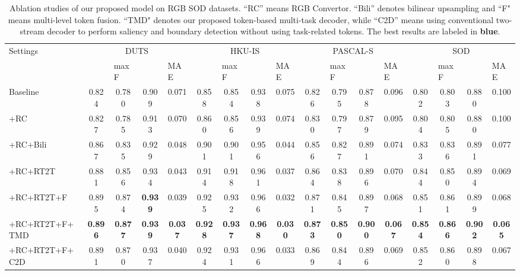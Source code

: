 \documentclass[10pt,twocolumn,letterpaper]{article}
\def\blu#1{\textbf{\color{blue} #1}} \def\red#1{\textbf{\color{red}\underline{#1}}}
\begin{document}
\begin{table*}[!ht]
\centering
\footnotesize
\renewcommand{\arraystretch}{1.1}
\renewcommand{\tabcolsep}{1.3mm}
\caption{Ablation studies of our proposed model on RGB SOD datasets. ``RC'' means RGB Convertor.  ``Bili'' denotes bilinear upsampling and ``F" means multi-level token fusion. ``TMD" denotes our proposed token-based multi-task decoder, while ``C2D'' means using conventional two-stream decoder to perform saliency and boundary detection without using task-related tokens. The best results are labeled in \blu{blue}.
}
\begin{tabular}{l|l|cccc|cccc|cccc|cccc}
\hline
\multicolumn{2}{l|}{\multirow{2}{*}{Settings}} & \multicolumn{4}{c|}{DUTS \cite{wang2017duts}} & \multicolumn{4}{c|}{HKU-IS \cite{li2015HKUIS}} & \multicolumn{4}{c|}{PASCAL-S \cite{li2014PASCALS}} & \multicolumn{4}{c}{SOD \cite{movahedi2010SOD}}\\
\multicolumn{2}{l|}{} & \multicolumn{1}{l}{} & \multicolumn{1}{l}{maxF} & \multicolumn{1}{l}{} & \multicolumn{1}{l|}{MAE}
                      & \multicolumn{1}{l}{} & \multicolumn{1}{l}{maxF} & \multicolumn{1}{l}{} & \multicolumn{1}{l|}{MAE}
                      & \multicolumn{1}{l}{} & \multicolumn{1}{l}{maxF} & \multicolumn{1}{l}{} & \multicolumn{1}{l|}{MAE}
                      & \multicolumn{1}{l}{} & \multicolumn{1}{l}{maxF} & \multicolumn{1}{l}{} & \multicolumn{1}{l}{MAE}




  \\ \hline

\multicolumn{2}{l|}{Baseline}  &0.824  &0.780  &0.909  &0.071 &0.858  &0.854  &0.938  &0.075 &0.826 &0.795 &0.878  &0.096 &0.802 &0.803  &0.880 &0.100 \\ \hline
\multicolumn{2}{l|}{+RC}      &0.827  &0.785  &0.913  &0.070 &0.860  &0.856  &0.939  &0.074 &0.830 &0.797 &0.879  &0.095 &0.804 &0.805  &0.880 &0.100  \\ \hline
\multicolumn{2}{l|}{+RC+Bili} &0.867  &0.835  &0.929  &0.048 &0.901  &0.901  &0.956  &0.044 &0.856 &0.827 &0.891  &0.074 &0.833 &0.836  &0.891 &0.077   \\
\multicolumn{2}{l|}{+RC+RT2T} &0.881  &0.856  &0.934  &0.043 &0.914  &0.918  &0.961  &0.037 &0.864 &0.838 &0.896  &0.070 &0.844 &0.850  &0.894 &0.069    \\ \hline
\multicolumn{2}{l|}{+RC+RT2T+F}  &0.895  &0.874  &\blu{0.939} &0.039 &0.925 &0.932 &0.966  &0.032 &0.871 &0.845 &0.897  &0.068 &0.851 &0.861  &0.899 &0.068  \\
\multicolumn{2}{l|}{+RC+RT2T+F+TMD}  &\blu{0.896}  &\blu{0.877} &\blu{0.939} &\blu{0.037} &\blu{0.928} &\blu{0.937} &\blu{0.968} &\blu{0.030} &\blu{0.873} &\blu{0.850} &\blu{0.900} &\blu{0.067} &\blu{0.854} &\blu{0.866} &\blu{0.902} &\blu{0.065}\\ \hline
\multicolumn{2}{l|}{+RC+RT2T+F+C2D}  &0.891  &0.870 &0.937 &0.040 &0.924 &0.931 &0.966 &0.033 &0.869 &0.844 &0.896 &0.069 &0.852 &0.860 &0.898 &0.067\\ \hline
\end{tabular}
\label{ablationTab2}
\end{table*}
\end{document}
